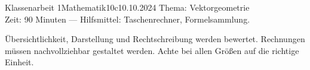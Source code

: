 \documentclass[12pt,fleqn,a4paper]{../exam2e}
\begin{document}
\thispagestyle{empty}%

\begin{klassenarbeitskopf}{Klassenarbeit 1}{Mathematik}{10c}{10.10.2024}
	Thema: Vektorgeometrie\\
	Zeit: 90 Minuten --- Hilfsmittel: Taschenrechner, Formelsammlung.
\end{klassenarbeitskopf}

\vspace*{1.5ex}
Übersichtlichkeit, Darstellung und Rechtschreibung werden bewertet.
Rechnungen müssen nachvollziehbar gestaltet werden. 
Achte bei allen Größen auf die richtige Einheit.
\end{document}
